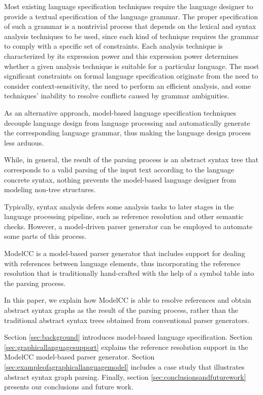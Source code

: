 \documentclass[floatfix,rmp,twocolumn,twoside]{revtex4}
\begin{document}
Most existing language specification techniques \cite{Aho2006} require the language designer to provide a textual specification of the language grammar. The proper specification of such a grammar is a nontrivial process that depends on the lexical and syntax analysis techniques to be used, since each kind of technique requires the grammar to comply with a specific set of constraints. Each analysis technique is characterized by its expression power and this expression power determines whether a given analysis technique is suitable for a particular language. The most significant constraints on formal language specification originate from the need to consider context-sensitivity, the need to perform an efficient analysis, and some techniques' inability to resolve conflicts caused by grammar ambiguities.

As an alternative approach, model-based language specification techniques \cite{Kleppe2007} decouple language design from language processing and automatically generate the corresponding language grammar, thus making the language design process less arduous.

While, in general, the result of the parsing process is an abstract syntax tree that corresponds to a valid parsing of the input text according to the language concrete syntax, nothing prevents the model-based language designer from modeling non-tree structures.

Typically, syntax analysis defers some analysis tasks to later stages in the language processing pipeline, such as reference resolution and other semantic checks. However, a model-driven parser generator can be employed to automate some parts of this process.

ModelCC \cite{Quesada2011c} is a model-based parser generator that includes support for dealing with references between language elements, thus incorporating the reference resolution that is traditionally hand-crafted with the help of a symbol table into the parsing process.

In this paper, we explain how ModelCC \cite{Quesada2011c} is able to resolve references and obtain abstract syntax graphs as the result of the parsing process, rather than the traditional abstract syntax trees obtained from conventional parser generators.

Section \ref{sec:background} introduces model-based language specification.
Section \ref{sec:graphicallanguagesupport} explains the reference resolution support in the ModelCC model-based parser generator.
Section \ref{sec:exampleofagraphicallanguagemodel} includes a case study that illustrates abstract syntax graph parsing.
Finally, section \ref{sec:conclusionsandfuturework} presents our conclusions and future work.
\end{document}
